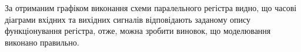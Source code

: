 \documentclass{article}
\begin{document}
\begin{normalsize}
\begin{figure}[H]
		\hspace{5px}
	\end{figure}

За отриманим графіком виконання схеми паралельного регістра видно, що часові діаграми вхідних та вихідних сигналів відповідають заданому опису функціонування регістра, отже, можна зробити виновок, що моделювання виконано правильно.


\end{normalsize}
\end{document}
